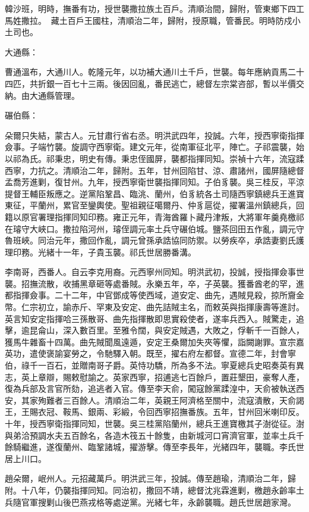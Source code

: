 \begin{pinyinscope}
韓沙班，明時，撫番有功，授世襲撒拉族土百戶。清順治間，歸附，管東鄉下四工馬姓撒拉。藏土百戶王國柱，清順治二年，歸附，授原職，管番民。明時防戍小土司也。

大通縣：

曹通溫布，大通川人。乾隆元年，以功補大通川土千戶，世襲。每年應納貢馬二十四匹，共折銀一百七十三兩。後因回亂，番民逃亡，總督左宗棠咨部，暫以半價交納。由大通縣管理。

碾伯縣：

朵爾只失結，蒙古人。元甘肅行省右丞。明洪武四年，投誠。六年，授西寧衛指揮僉事。子端竹襲。旋調守西寧衛。建文元年，從南軍征北平，陣亡。子祁震襲，始以祁為氏。祁秉忠，明史有傳。秉忠侄國屏，襲都指揮同知。崇禎十六年，流寇蹂西寧，力抗之。清順治二年，歸附。五年，甘州回陷甘、涼、肅諸州，國屏隨總督孟喬芳進剿，復甘州。九年，授西寧衛世襲指揮同知。子伯豸襲。吳三桂反，平涼提督王輔臣叛應之。逆黨陷鞏昌、臨洮、蘭州，伯豸統各土司隨西寧鎮總兵王進寶東征，平蘭州，累官至鑾輿使。聖祖親征噶爾丹、仲豸扈從，擢署溫州鎮總兵，回籍以原官署理指揮同知印務。雍正元年，青海酋羅卜藏丹津叛，大將軍年羹堯檄祁在璿守大峽口。撒拉陷河州，璿侄調元率土兵守碾伯城。鹽茶回田五作亂，調元守魯班峽。同治元年，撒回作亂，調元曾孫承誥協同防禦。以勞疾卒，承誥妻劉氏護理印務。光緒十一年，子貴玉襲。祁氏世居勝番溝。

李南哥，西番人。自云李克用裔。元西寧州同知。明洪武初，投誠，授指揮僉事世襲。招撫流散，收捕黑章砸等處番賊。永樂五年，卒，子英襲。獲番酋老的罕，進都指揮僉事。二十二年，中官鄧成等使西域，道安定、曲先，遇賊見殺，掠所齎金幣。仁宗初立，諭赤斤、罕東及安定、曲先詰賊主名，而敕英與指揮康壽等進討。英言知安定指揮哈三孫散哥、曲先指揮散即思實殺使者，遂率兵西入。賊驚走，追擊，逾昆侖山，深入數百里。至雅令闊，與安定賊遇，大敗之，俘斬千一百餘人，獲馬牛雜畜十四萬。曲先賊聞風遠遁，安定王桑爾加失夾等懼，詣闕謝罪。宣宗嘉英功，遣使褒諭宴勞之，令馳驛入朝。既至，擢右府左都督。宣德二年，封會寧伯，祿千一百石，並贈南哥子爵。英恃功驕，所為多不法。寧夏總兵史昭奏英有異志，英上章辯，賜敕慰諭之。英家西寧，招逋逃七百餘戶，置莊墾田，豪奪人產，復為兵部及言官所劾，追逃者入官。傳至李天俞，闖寇餘黨蹂湟中，天俞被執送西安，其家殉難者三百餘人。清順治二年，英親王阿濟格至關中，流寇潰散，天俞謁王，王賜衣冠、鞍馬、銀兩、彩緞，令回西寧招撫番族。五年，甘州回米喇印反。十年，授西寧衛指揮同知，世襲。吳三桂黨陷蘭州，總兵王進寶檄其子澍從征。澍與弟洽預調水夫五百餘名，各造木筏五十餘隻，由新城河口宵濟官軍，並率土兵千餘騎繼進，遂復蘭州、臨鞏諸城，擢游擊。傳至李長年，光緒四年，襲職。李氏世居上川口。

趙朵爾，岷州人。元招藏萬戶。明洪武三年，投誠。傳至趙瑜，清順治二年，歸附。十八年，仍襲指揮同知。同治初，撒回不靖，總督沈兆霖進剿，檄趙永齡率土兵隨官軍搜剿山後巴燕戎格等處逆黨。光緒七年，永齡襲職。趙氏世居趙家灣。


\end{pinyinscope}
